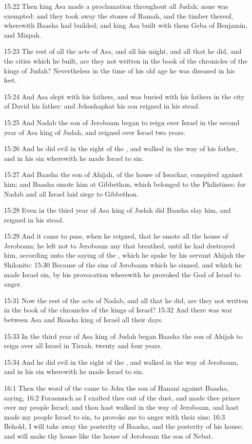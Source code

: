 15:22 Then king Asa made a proclamation throughout all Judah; none was exempted: and they took away the stones of Ramah, and the timber thereof, wherewith Baasha had builded; and king Asa built with them Geba of Benjamin, and Mizpah.

15:23 The rest of all the acts of Asa, and all his might, and all that he did, and the cities which he built, are they not written in the book of the chronicles of the kings of Judah? Nevertheless in the time of his old age he was diseased in his feet.

15:24 And Asa slept with his fathers, and was buried with his fathers in the city of David his father: and Jehoshaphat his son reigned in his stead.

15:25 And Nadab the son of Jeroboam began to reign over Israel in the second year of Asa king of Judah, and reigned over Israel two years.

15:26 And he did evil in the sight of the \LORD, and walked in the way of his father, and in his sin wherewith he made Israel to sin.

15:27 And Baasha the son of Ahijah, of the house of Issachar, conspired against him; and Baasha smote him at Gibbethon, which belonged to the Philistines; for Nadab and all Israel laid siege to Gibbethon.

15:28 Even in the third year of Asa king of Judah did Baasha slay him, and reigned in his stead.

15:29 And it came to pass, when he reigned, that he smote all the house of Jeroboam; he left not to Jeroboam any that breathed, until he had destroyed him, according unto the saying of the \LORD, which he spake by his servant Ahijah the Shilonite: 15:30 Because of the sins of Jeroboam which he sinned, and which he made Israel sin, by his provocation wherewith he provoked the \LORD God of Israel to anger.

15:31 Now the rest of the acts of Nadab, and all that he did, are they not written in the book of the chronicles of the kings of Israel?  15:32 And there was war between Asa and Baasha king of Israel all their days.

15:33 In the third year of Asa king of Judah began Baasha the son of Ahijah to reign over all Israel in Tirzah, twenty and four years.

15:34 And he did evil in the sight of the \LORD, and walked in the way of Jeroboam, and in his sin wherewith he made Israel to sin.

16:1 Then the word of the \LORD came to Jehu the son of Hanani against Baasha, saying, 16:2 Forasmuch as I exalted thee out of the dust, and made thee prince over my people Israel; and thou hast walked in the way of Jeroboam, and hast made my people Israel to sin, to provoke me to anger with their sins; 16:3 Behold, I will take away the posterity of Baasha, and the posterity of his house; and will make thy house like the house of Jeroboam the son of Nebat.

